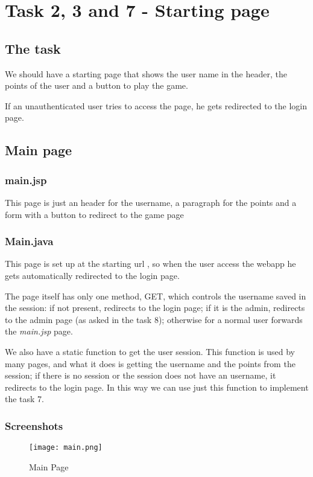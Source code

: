 \section{Task 2, 3 and 7 - Starting page}
\subsection{The task}
We should have a starting page that shows the user name in the header, the points of the user and a button to play the game.

If an unauthenticated user tries to access the page, he gets redirected to the login page.
\subsection{Main page}
\subsubsection{main.jsp}
This page is just an header for the username, a paragraph for the points and a form with a button to redirect to the game page
\subsubsection{Main.java}
This page is set up at the starting url \textit{\/}, so when the user access the webapp he gets automatically redirected to the login page.

The page itself has only one method, GET, which controls the username saved in the session: if not present, redirects to the login page; if it is the admin, redirects to the admin page (as asked in the task 8); otherwise for a normal user forwards the \textit{main.jsp} page.

We also have a static function to get the user session. This function is used by many pages, and what it does is getting the username and the points from the session; if there is no session or the session does not have an username, it redirects to the login page. In this way we can use just this function to implement the task 7.


\subsubsection{Screenshots}
\begin{figure}[H]
  \centering
  \texttt{[image: main.png]}
  \caption{Main Page}
\end{figure}